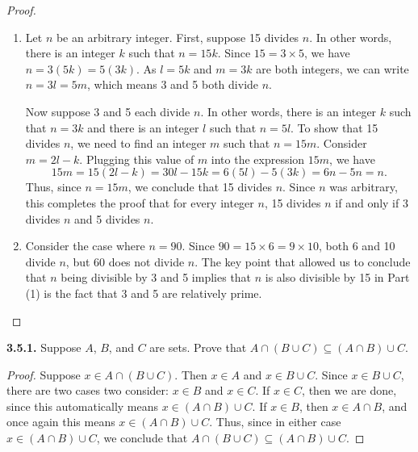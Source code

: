 \documentclass[12pt]{amsart}
\newenvironment{statement}[1]{\smallskip\noindent\color[rgb]{.6627, .3529, .6314} {\bf #1.}}{}
\theoremstyle{definition}
\theoremstyle{remark}
\begin{document}
\begin{proof}
\hfill
\begin{enumerate}
	\item Let $n$ be an arbitrary integer.
	First, suppose 15 divides $n$.
	In other words, there is an integer $k$ such that $n = 15k$.
	Since $15 = 3 \times 5$, we have $n = 3(5k) = 5(3k)$.
	As $l = 5k$ and $m = 3k$ are both integers, we can write $n = 3l = 5m$,
	which means 3 and 5 both divide $n$.
	
	Now suppose 3 and 5 each divide $n$.
	In other words, there is an integer $k$ such that $n = 3k$
	and there is an integer $l$ such that $n = 5l$.
	To show that 15 divides $n$, we need to find an integer $m$ such that $n = 15m$.
	Consider $m = 2l - k$.
	Plugging this value of $m$ into the expression $15m$, we have
	\begin{equation*}
		15m = 15(2l - k) = 30l - 15k = 6(5l) - 5(3k) = 6n - 5n = n.
	\end{equation*}
	Thus, since $n = 15m$, we conclude that 15 divides $n$.
	Since $n$ was arbitrary, this completes the proof that for every integer $n$,
	15 divides $n$ if and only if 3 divides $n$ and 5 divides $n$.
	
	\item Consider the case where $n = 90$.
	Since $90 = 15 \times 6 = 9 \times 10$, both 6 and 10 divide $n$, but 60 does not divide $n$.
	The key point that allowed us to conclude that $n$ being divisible by 3 and 5 implies that $n$
	is also divisible by 15 in Part (1) is the fact that 3 and 5 are relatively prime.
\end{enumerate}
\end{proof}


\begin{statement}{3.5.1}
Suppose $A$, $B$, and $C$ are sets.
Prove that $A \cap (B \cup C) \subseteq (A \cap B) \cup C$.
\end{statement}

\begin{proof}
Suppose $x \in A \cap (B \cup C)$.
Then $x \in A$ and $x \in B \cup C$.
Since $x \in B \cup C$, there are two cases two consider: $x \in B$ and $x \in C$.
If $x \in C$, then we are done, since this automatically means $x \in (A \cap B) \cup C$.
If $x \in B$, then $x \in A \cap B$, and once again this means $x \in (A \cap B) \cup C$.
Thus, since in either case $x \in (A \cap B) \cup C$, we conclude that $A \cap (B \cup C) \subseteq (A \cap B) \cup C$.
\end{proof}
\end{document}

